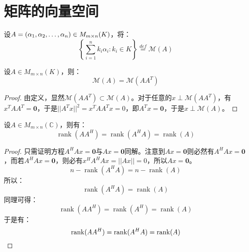 \section{矩阵的向量空间}

\begin{definition}
	设$A=(\alpha_1, \alpha_2, \dots, \alpha_{n})\in M_{m\times n}(K)$，将：
	\begin{equation*}
		\left\{\sum_{i=1}^{n}k_i\alpha_i:k_i\in K\right\}\overset{def}{=}\mathcal{M}(A)
	\end{equation*}
\end{definition}

\begin{theorem}\label{theo:VectorSpaceAAAT}
	设$A\in M_{m\times n}(K)$，则：
	\begin{equation*}
		\mathcal{M}(A)=\mathcal{M}(AA^T)
	\end{equation*}
\end{theorem}
\begin{proof}
	由定义，显然$\mathcal{M}(AA^T)\subset\mathcal{M}(A)$。对于任意的$x\perp\mathcal{M}(AA^T)$，有$x^TAA^T=\mathbf{0}$，于是$||A^Tx||^2=x^TAA^Tx=0$，即$A^Tx=\mathbf{0}$，于是$x\perp\mathcal{M}(A)$。
\end{proof}

\begin{theorem}\label{theo:RankAAHA}
	设$A\in M_{m\times n}(\mathbb{C})$，则有：
	\begin{equation*}
		\operatorname{rank}(AA^H)=\operatorname{rank}(A^HA)=\operatorname{rank}(A)
	\end{equation*}
\end{theorem}
\begin{proof}
	只需证明方程$A^HAx=\mathbf{0}$与$Ax=\mathbf{0}$同解。注意到$Ax=\mathbf{0}$则必然有$A^HAx=\mathbf{0}$，而若$A^HAx=\mathbf{0}$，则必有$x^HA^HAx=||Ax||=0$，所以$Ax=\mathbf{0}$。
	\begin{equation*}
		n-\operatorname{rank}(A^HA)=n-\operatorname{rank}(A)
	\end{equation*}
	所以：
	\begin{equation*}
		\operatorname{rank}(A^HA)=\operatorname{rank}(A)
	\end{equation*}
	同理可得：
	\begin{equation*}
		\operatorname{rank}(AA^H)=\operatorname{rank}(A^H)=\operatorname{rank}(A)
	\end{equation*}
	于是有：
	\begin{equation*}
		\operatorname{rank}(AA^H)=\operatorname{rank}(A^HA)=\operatorname{rank}(A)\qedhere
	\end{equation*}
\end{proof}